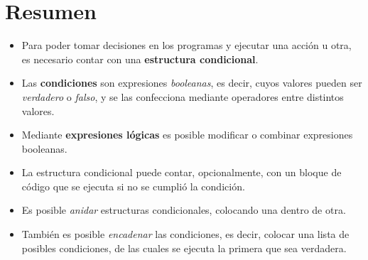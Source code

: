 

\section{Resumen}
\begin{itemize}
\item Para poder tomar decisiones en los programas y ejecutar una acción u
otra, es necesario contar con una \textbf{estructura condicional}.
\item Las \textbf{condiciones} son expresiones \textit{booleanas}, es
decir, cuyos valores pueden ser \textit{verdadero} o \textit{falso}, y se
las confecciona mediante operadores entre distintos valores.
\item Mediante \textbf{expresiones lógicas} es posible modificar o combinar
expresiones booleanas.
\item La estructura condicional puede contar, opcionalmente, con un bloque
de código que se ejecuta si no se cumplió la condición.
\item Es posible \textit{anidar} estructuras condicionales, colocando una
dentro de otra.
\item También es posible \textit{encadenar} las condiciones, es decir,
colocar una lista de posibles condiciones, de las cuales se ejecuta la
primera que sea verdadera.
\end{itemize}

